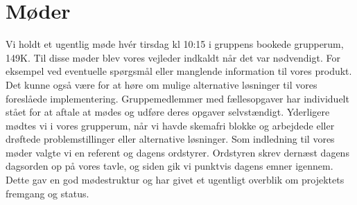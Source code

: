 \section{Møder}

Vi holdt et ugentlig møde hvér tirsdag kl 10:15 i gruppens bookede grupperum, 149K. Til disse møder blev vores vejleder indkaldt når det var nødvendigt. For eksempel ved eventuelle spørgsmål eller manglende information til vores produkt. Det kunne også være for at høre om mulige alternative løsninger til vores foreslåede implementering. 
Gruppemedlemmer med fællesopgaver har individuelt stået for at aftale at mødes og udføre deres opgaver selvstændigt.
Yderligere mødtes vi i vores grupperum, når vi havde skemafri blokke og arbejdede eller drøftede problemstillinger eller alternative løsninger. 
Som indledning til vores møder valgte vi en referent og dagens ordstyrer. Ordstyren skrev dernæst dagens dagsorden op på vores tavle, og siden gik vi punktvis dagens emner igennem. Dette gav en god mødestruktur og har givet et ugentligt overblik om projektets fremgang og status.